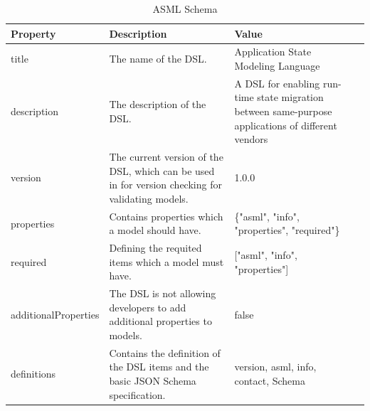 \FloatBarrier
\begin{table}[H]
\begin{tabularx}{\textwidth}{|l|X|X|r|}
\hline
Property             & Description                                                                              & Value                                                                                                                   \\\hline
title                & The name of the DSL.                                                                     & Application State Modeling Language                                                                                     \\\hline
description          & The description of the DSL.                                                              & A DSL for enabling run-time state migration between same-purpose applications of different vendors \\\hline
version              & The current version of the DSL, which can be used in for version checking for validating models. & 1.0.0                                                                                                                   \\\hline
properties           & Contains properties which a model should have.                                       & \{"asml", "info", "properties", "required"\}                                                                            \\\hline
required             & Defining the requited items which a model must have.                                     & {[}"asml", "info", "properties"{]}                                                                                      \\\hline
additionalProperties & The DSL is not allowing developers to add additional properties to models.               & false                                                                                                                   \\\hline
definitions          & Contains the definition of the DSL items and the basic JSON Schema specification.        & version, asml, info, contact, Schema

\\\hline
\end{tabularx}
\caption{ASML Schema}
\label{tab:asml-schema}
\end{table}
\FloatBarrier





